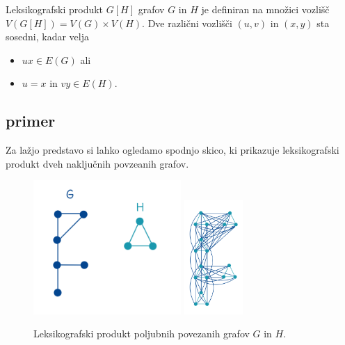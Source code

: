 \documentclass[mat1, tisk]{fmfdelo}
\begin{document}
\begin{definicija}
    Leksikografski produkt $G[H]$ grafov $G$ in $H$ je definiran na množici vozlišč $V (G[H]) = V (G)\times V (H)$. Dve različni vozlišči $(u, v)$ in $(x, y)$ sta sosedni, kadar velja
\begin{itemize}
    \item $ux \in E(G)$ ali
    \item $u = x$ in $vy \in E(H).$ 
\end{itemize}
\end{definicija}

\subsection{primer}
Za lažjo predstavo si lahko ogledamo spodnjo skico, ki prikazuje leksikografski produkt
dveh naključnih povzeanih grafov.
\begin{figure}[h]
    \caption{Leksikografski produkt poljubnih povezanih grafov $G$ in $H$.}
    \centering
    \includegraphics[width=0.5\textwidth]{leks_produkt_1.jpg}
    \includegraphics[width=0.2\textwidth]{leks_produkt_2.jpg}        
\end{figure}

\end{document}
